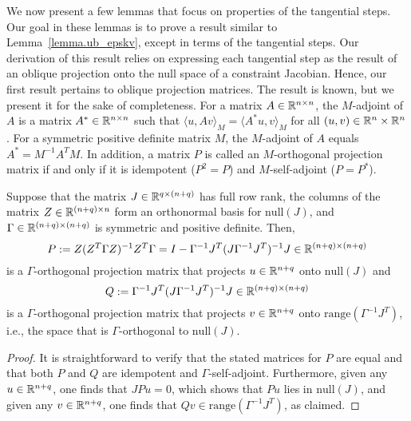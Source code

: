 We now present a few lemmas that focus on properties of the tangential steps.  Our goal in these lemmas is to prove a result similar to Lemma~\ref{lemma.ub_epskv}, except in terms of the tangential steps.  Our derivation of this result relies on expressing each tangential step as the result of an oblique projection onto the null space of a constraint Jacobian.  Hence, our first result pertains to oblique projection matrices.  The result is known, but we present it for the sake of completeness.  For a matrix $A \in \mathbb{R}^{n \times n}$, the $M$-adjoint of $A$ is a matrix $A^* \in \mathbb{R}^{n \times n}$ such that $\langle u, Av \rangle_{M} = \langle A^* u, v \rangle_{M}$ for all $(u, v) \in \mathbb{R}^n \times \mathbb{R}^n$. For a symmetric positive definite matrix $M$, the $M$-adjoint of $A$ equals $A^* = M^{-1} A^T M$. In addition, a matrix $P$ is called an $M$-orthogonal projection matrix if and only if it is idempotent ($P^2 = P$) and $M$-self-adjoint ($P = P^*$).

\begin{lemma}\label{lemma.prelim_tang_1}
  Suppose that the matrix $J \in \mathbb{R}^{q \times (n+q)}$ has full row rank, the columns of the matrix $Z \in \mathbb{R}^{(n+q) \times n}$ form an orthonormal basis for $\mathrm{null}(J)$, and $\Gamma \in \mathbb{R}^{(n+q) \times (n+q)}$ is symmetric and positive definite.  Then,
  \begin{equation*}
    P := Z (Z^T \Gamma Z)^{-1} Z^T \Gamma = I - \Gamma^{-1} J^T (J \Gamma^{-1} J^T)^{-1} J \in \mathbb{R}^{(n+q) \times (n+q)}
  \end{equation*}
  is a $\Gamma$-orthogonal projection matrix that projects $u \in \mathbb{R}^{n+q}$ onto $\mathrm{null}(J)$ and
  \begin{equation*}
    Q := \Gamma^{-1} J^T (J \Gamma^{-1} J^T)^{-1} J \in \mathbb{R}^{(n+q) \times (n+q)}
  \end{equation*}
  is a $\Gamma$-orthogonal projection matrix that projects $v \in \mathbb{R}^{n+q}$ onto $\mathrm{range}(\Gamma^{-1}J^T)$, i.e., the space that is $\Gamma$-orthogonal to $\mathrm{null}(J)$.
\end{lemma}
\begin{proof}
  It is straightforward to verify that the stated matrices for $P$ are equal and that both $P$ and $Q$ are idempotent and $\Gamma$-self-adjoint.  Furthermore, given any $u \in \mathbb{R}^{n+q}$, one finds that $JPu = 0$, which shows that $Pu$ lies in $\mathrm{null}(J)$, and given any $v \in \mathbb{R}^{n+q}$, one finds that $Qv \in \mathrm{range}(\Gamma^{-1}J^T)$, as claimed.
\end{proof}

